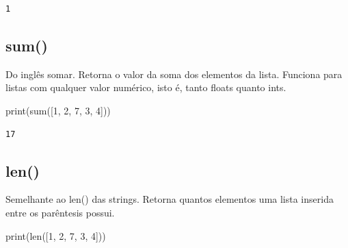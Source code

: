 \documentclass[
  letterpaper,
  DIV=11,
  numbers=noendperiod]{scrreprt}
\newenvironment{Shaded}{\begin{snugshade}}{\end{snugshade}}
\newcommand{\BuiltInTok}[1]{\textcolor[rgb]{0.00,0.23,0.31}{#1}}
\newcommand{\DecValTok}[1]{\textcolor[rgb]{0.68,0.00,0.00}{#1}}
\newcommand{\NormalTok}[1]{\textcolor[rgb]{0.00,0.23,0.31}{#1}}
\begin{document}
\begin{tcolorbox}[enhanced jigsaw, breakable, leftrule=.75mm, left=2mm, opacityback=0, bottomrule=.15mm, toprule=.15mm, rightrule=.15mm, arc=.35mm, colback=white]

\begin{verbatim}
1
\end{verbatim}

\end{tcolorbox}

\hypertarget{sum}{%
\subsection{sum()}\label{sum}}

Do inglês somar. Retorna o valor da soma dos elementos da lista.
Funciona para listas com qualquer valor numérico, isto é, tanto floats
quanto ints.

\begin{Shaded}
\begin{Highlighting}[]
\BuiltInTok{print}\NormalTok{(}\BuiltInTok{sum}\NormalTok{([}\DecValTok{1}\NormalTok{, }\DecValTok{2}\NormalTok{, }\DecValTok{7}\NormalTok{, }\DecValTok{3}\NormalTok{, }\DecValTok{4}\NormalTok{]))}
\end{Highlighting}
\end{Shaded}

\begin{tcolorbox}[enhanced jigsaw, breakable, leftrule=.75mm, left=2mm, opacityback=0, bottomrule=.15mm, toprule=.15mm, rightrule=.15mm, arc=.35mm, colback=white]

\begin{verbatim}
17
\end{verbatim}

\end{tcolorbox}

\hypertarget{len-1}{%
\subsection{len()}\label{len-1}}

Semelhante ao len() das strings. Retorna quantos elementos uma lista
inserida entre os parêntesis possui.

\begin{Shaded}
\begin{Highlighting}[]
\BuiltInTok{print}\NormalTok{(}\BuiltInTok{len}\NormalTok{([}\DecValTok{1}\NormalTok{, }\DecValTok{2}\NormalTok{, }\DecValTok{7}\NormalTok{, }\DecValTok{3}\NormalTok{, }\DecValTok{4}\NormalTok{]))}
\end{Highlighting}
\end{Shaded}
\end{document}
